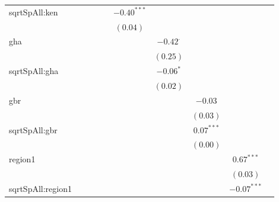 \begin{sidewaystable}
\begin{center}
{\begin{tabular}{l c c c c c c c c c}
sqrtSpAll:ken     &               &               &               &               & $-0.40^{***}$ &                 &               &               &               \\
                  &               &               &               &               & $(0.04)$      &                 &               &               &               \\
gha               &               &               &               &               &               & $-0.42^{\cdot}$ &               &               &               \\
                  &               &               &               &               &               & $(0.25)$        &               &               &               \\
sqrtSpAll:gha     &               &               &               &               &               & $-0.06^{*}$     &               &               &               \\
                  &               &               &               &               &               & $(0.02)$        &               &               &               \\
gbr               &               &               &               &               &               &                 & $-0.03$       &               &               \\
                  &               &               &               &               &               &                 & $(0.03)$      &               &               \\
sqrtSpAll:gbr     &               &               &               &               &               &                 & $0.07^{***}$  &               &               \\
                  &               &               &               &               &               &                 & $(0.00)$      &               &               \\
region1           &               &               &               &               &               &                 &               & $0.67^{***}$  &               \\
                  &               &               &               &               &               &                 &               & $(0.03)$      &               \\
sqrtSpAll:region1 &               &               &               &               &               &                 &               & $-0.07^{***}$ &               \\

\end{tabular}}
\end{center}
\end{sidewaystable}

